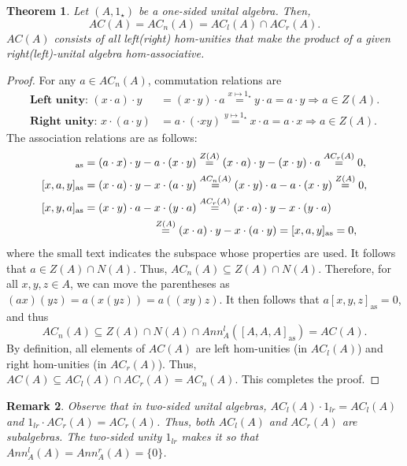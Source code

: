 \documentclass[12pt]{article}
\newtheorem{theorem}{Theorem}
\newtheorem{remark}[theorem]{Remark}
\begin{document}
		\begin{theorem}
			Let $(A,1_\star)$ be a one-sided unital algebra. Then,
			\begin{equation*}AC(A)=AC_n(A)=AC_l(A)\cap AC_r(A).
			\end{equation*}
			$AC(A)$ consists of all left\textnormal{(}right\textnormal{)} hom-unities that make the product of a given right\textnormal{(}left\textnormal{)}-unital algebra hom-associative.
		\end{theorem}
		\begin{proof}
			For any $a\in AC_n(A)$, commutation relations are
			\begin{align*}
				\textbf{Left unity: }(x\cdot a)\cdot y&=(x\cdot y)\cdot a\overset{x\mapsto 1_\star}{=}y\cdot a=a\cdot y\Rightarrow a\in Z(A). \\
				\textbf{Right unity: }x\cdot (a\cdot y)&=a\cdot (\cdot xy)\overset{y\mapsto 1_\star}{=}x\cdot a=a\cdot x\Rightarrow a\in Z(A).
			\end{align*}
			The association relations are as follows:
			\begin{align*}
				[a,x,y]_{\mathrm{as}}&=(a\cdot x)\cdot y-a\cdot (x\cdot y)\overset{ Z(A)}{=}(x\cdot a)\cdot y-(x\cdot y)\cdot a\overset{ AC_r(A)}{=}0,\\
				[x,a,y]_{\mathrm{as}}&=(x\cdot a)\cdot y-x\cdot (a\cdot y)\overset{ AC_n(A)}{=}(x\cdot y)\cdot a-a\cdot (x\cdot y)\overset{ Z(A)}{=}0,\\
				[x,y,a]_{\mathrm{as}}&=(x\cdot y)\cdot a-x\cdot (y\cdot a)\overset{ AC_r(A)}{=}(x\cdot a)\cdot y-x\cdot (y\cdot a)\\
				&\hspace{2.2cm}\overset{ Z(A)}{=}(x\cdot a)\cdot y-x\cdot (a\cdot y)=[x,a,y]_{\mathrm{as}}=0,
			\end{align*}
			where the small text indicates the subspace whose properties are used. It follows that $a\in Z(A)\cap N(A)$. Thus,  $AC_n(A)\subseteq Z(A)\cap N(A)$. Therefore, for all $x,y,z\in A$, we can move the parentheses as $(ax)(yz)=a(x(yz))= a((xy)z)$. It then follows that $a[x,y,z]_{\mathrm{as}}=0$, and thus
			\begin{equation*}
				AC_n(A)\subseteq Z(A)\cap N(A)\cap Ann_A^l([A,A,A]_{\mathrm{as}})=AC(A).
			\end{equation*}
			By definition, all elements of $AC(A)$ are left hom-unities (in $AC_l(A)$) and right hom-unities (in $AC_r(A)$). Thus,  $AC(A)\subseteq AC_l(A)\cap AC_r(A)= AC_n(A)$. This completes the proof.
		\end{proof}
		\begin{remark}
			Observe that in two-sided unital algebras, $AC_l(A)\cdot 1_{lr}=AC_l(A)$ and $1_{lr}\cdot AC_r(A)=AC_r(A)$. Thus, both $AC_l(A)$ and $AC_r(A)$ are subal\-gebras. The two-sided unity $1_{lr}$ makes it so that $Ann_A^l(A)=Ann_A^r(A)=\{0\}$.
		\end{remark}
		
\end{document}
